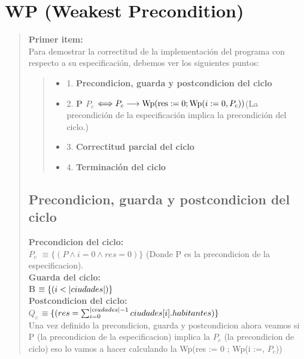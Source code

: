 \documentclass[10pt,a4paper]{article}
\begin{document}
\section{WP (Weakest Precondition)}
\begin{quote}
 \textbf{Primer item:} 
 \\
 Para demostrar la correctitud de la implementación del programa con respecto a su especificación, debemos ver los siguientes puntos:
 \begin{quote}
 \begin{itemize}
 	\item 1. \textbf{Precondicion, guarda y postcondicion del ciclo}
 	\item 2. \textbf{P \implica $P_c$} $\Longleftrightarrow P_c \longrightarrow \text{Wp}(\text{res} := 0; \text{Wp}(i := 0, P_c))$(La precondición de la especificación implica la precondición del ciclo.)
 	\item 3. \textbf{Correctitud parcial del ciclo} 
 	\item 4. \textbf{Terminación del ciclo} 
 \end{itemize}
 \end{quote}
 \subsection{Precondicion, guarda y postcondicion del ciclo}
 \textbf{Precondicion del ciclo:} \\ 
 \vspace{0.2cm}
 \textbf{$P_c$} $\equiv \{(P \land i = 0 \land res = 0)\}$ (Donde P es la precondicion de la especificacion).\\
 \vspace{0.2cm}
 \textbf{Guarda del ciclo:}\\ 
 \vspace{0.2cm}
 \textbf{B} $\equiv \{(i < |ciudades|)\}$ \\
 \vspace*{0.2cm}
 \textbf{Postcondicion del ciclo:} \\
 \vspace{0.2cm}
 \textbf{$Q_c$} $\equiv \{(res = \sum_{i=0}^{|ciudades|-1}ciudades[i].habitantes)\} $ \\ 
 \vspace{0.2cm}
 Una vez definido la precondicion, guarda y postcondicion ahora veamos si P (la precondicion de la especificacion) implica la $P_c$ (la precondicion de ciclo) eso lo vamos a hacer calculando la Wp(res := 0 ; Wp(i :=, $P_c$))

\end{quote}
\end{document}
